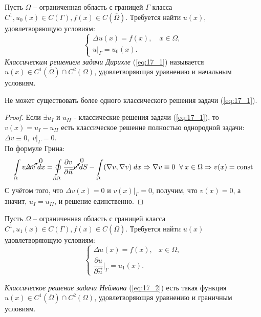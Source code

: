 \documentclass[../main.tex]{subfiles}
\begin{document}
Пусть $\Omega$ -- ограниченная область с границей $\Gamma$ класса $C^1, u_0(x) \in C(\Gamma), f(x) \in C(\overline{\Omega})$. Требуется найти $u(x)$, удовлетворяющую условиям:
\begin{equation}
\label{eq:17_1}
	\begin{cases}
		\Delta u(x) = f(x), \quad x \in \Omega, \\
		u\bigr|_{\Gamma} = u_0(x).
	\end{cases}
\end{equation}
\textit{Классическим решением задачи Дирихле} (\ref{eq:17_1}) называется $u(x) \in C^1(\overline{\Omega}) \cap C^2({\Omega})$, удовлетворяющая уравнению и начальным условиям. \\
\begin{lemma}
Не может существовать более одного классического решения задачи (\ref{eq:17_1}).
\end{lemma}
\begin{proof}
Если $\exists u_{I}$ и $u_{II}$ - классические решения задачи (\ref{eq:17_1}), то $v(x) = u_{I} - u_{II}$ есть классическое решение полностью однородной задачи: $\Delta v \equiv 0,\; v\bigr|_{\Gamma} = 0$. \\
По формуле Грина:
\begin{equation*}
	\int\limits_{\Omega} v\cancelto{0}{\Delta v}\; dx = \oint\limits_{\partial \Omega}\dfrac{\partial v}{\partial \vec{n}}\cancelto{0}{v}\;dS - \int\limits_{\Omega}(\nabla v, \nabla v)\;dx \Rightarrow \nabla v \equiv 0 \;\;\forall\: x \in \Omega \Rightarrow v(x) = \text{const}
\end{equation*}
С учётом того, что $\Delta v(x) = 0$ и $v(x)\bigr|_{\Gamma} = 0$, получим, что $v(x) = 0$, а значит, $u_{I} = u_{II}$, и решение единственно.
\end{proof}
Пусть $\Omega$ -- ограниченная область с границей класса $C^1, u_1(x) \in C(\Gamma), f(x) \in C(\overline{\Omega})$. Требуется найти $u(x)$ удовлетворяющую условиям:
\begin{equation}
\label{eq:17_2}
    \begin{cases}
        \Delta u(x) = f(x), & x \in \Omega, \\
	\dfrac{\partial u}{\partial \vec{n}} \biggr|_{\Gamma} = u_1(x).
    \end{cases}
\end{equation}
\begin{definition}
\textit{Классическое решение задачи Неймана} (\ref{eq:17_2}) есть такая функция $u(x) \in C^1(\overline{\Omega}) \cap C^2({\Omega})$, удовлетворяющая уравнению и граничным условиям.
\end{definition}
\end{document}
